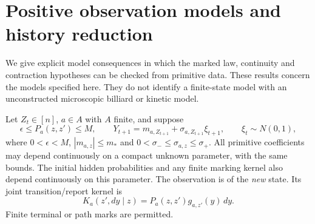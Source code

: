 \section{Positive observation models and history reduction}
\label{sec:v10-positive-models}

We give explicit model consequences in which the marked law,
continuity and contraction hypotheses can be checked from primitive
data. These results concern the models specified here. They do not
identify a finite-state model with an unconstructed microscopic
billiard or kinetic model.

Let $Z_t\in[n]$, $a\in A$ with $A$ finite, and suppose
\begin{equation}\label{eq:v10-positive-data}
 \epsilon\le P_a(z,z')\le M,\qquad
 Y_{t+1}=m_{a,Z_{t+1}}+\sigma_{a,Z_{t+1}}\xi_{t+1},
 \qquad \xi_t\sim N(0,1),
\end{equation}
where $0<\epsilon<M$, $|m_{a,z}|\le m_*$ and
$0<\sigma_-\le\sigma_{a,z}\le\sigma_+$. All primitive coefficients
may depend continuously on a compact unknown parameter, with the
same bounds. The initial hidden probabilities and any finite marking
kernel also depend continuously on this parameter. The observation is of the \emph{new} state. Its joint
transition/report kernel is
\[
 K_a(z',dy\mid z)=P_a(z,z')g_{a,z'}(y)\,dy.
\]
Finite terminal or path marks are permitted.

